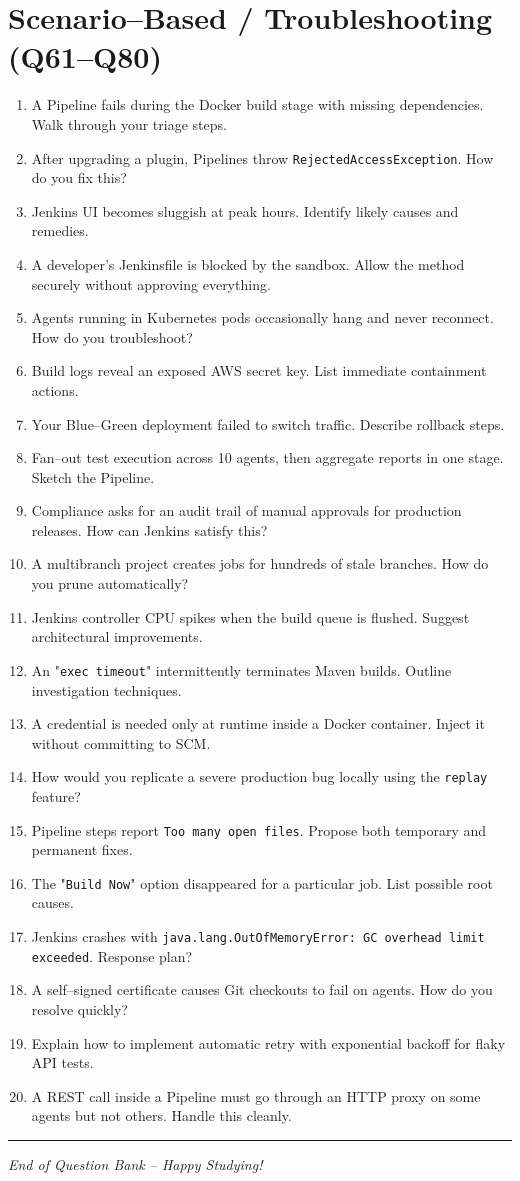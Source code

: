 \documentclass[12pt]{article}
\begin{document}
\section*{Scenario--Based / Troubleshooting (Q61--Q80)}
\begin{enumerate}[label=\textbf{\arabic*.},start=61]
  \item A Pipeline fails during the Docker build stage with missing dependencies.  Walk through your triage steps.
  \item After upgrading a plugin, Pipelines throw \texttt{RejectedAccessException}.  How do you fix this?
  \item Jenkins UI becomes sluggish at peak hours.  Identify likely causes and remedies.
  \item A developer's Jenkinsfile is blocked by the sandbox.  Allow the method securely without approving everything.
  \item Agents running in Kubernetes pods occasionally hang and never reconnect.  How do you troubleshoot?
  \item Build logs reveal an exposed AWS secret key.  List immediate containment actions.
  \item Your Blue--Green deployment failed to switch traffic.  Describe rollback steps.
  \item Fan--out test execution across 10 agents, then aggregate reports in one stage.  Sketch the Pipeline.
  \item Compliance asks for an audit trail of manual approvals for production releases.  How can Jenkins satisfy this?
  \item A multibranch project creates jobs for hundreds of stale branches.  How do you prune automatically?
  \item Jenkins controller CPU spikes when the build queue is flushed.  Suggest architectural improvements.
  \item An "\texttt{exec timeout}" intermittently terminates Maven builds.  Outline investigation techniques.
  \item A credential is needed only at runtime inside a Docker container.  Inject it without committing to SCM.
  \item How would you replicate a severe production bug locally using the \texttt{replay} feature?
  \item Pipeline steps report \texttt{Too many open files}.  Propose both temporary and permanent fixes.
  \item The "\texttt{Build Now}" option disappeared for a particular job.  List possible root causes.
  \item Jenkins crashes with \texttt{java.lang.OutOfMemoryError: GC overhead limit exceeded}.  Response plan?
  \item A self--signed certificate causes Git checkouts to fail on agents.  How do you resolve quickly?
  \item Explain how to implement automatic retry with exponential backoff for flaky API tests.
  \item A REST call inside a Pipeline must go through an HTTP proxy on some agents but not others.  Handle this cleanly.
\end{enumerate}

\bigskip
\hrule
\bigskip
\begin{center}
\textit{End of Question Bank -- Happy Studying!}
\end{center}
\end{document}
